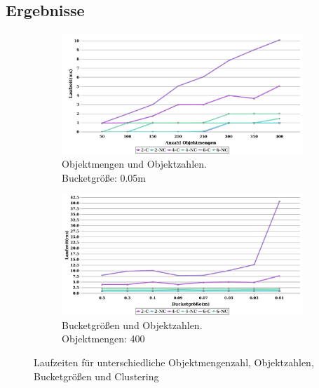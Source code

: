 \subsection{Ergebnisse}

\begin{figure}
  \centering
  \begin{subfigure}[b]{0.85\textwidth}
  \centering
  \includegraphics[width=1.0\textwidth]{bilder/eval1.pdf}
  \caption{Objektmengen und Objektzahlen.\\ Bucketgröße: 0.05m}
  \label{fig:eval-sc-oc}
  \end{subfigure}
  \begin{subfigure}[b]{0.85\textwidth}
  \centering
  \includegraphics[width=1.0\textwidth]{bilder/eval2.pdf}
  \caption{Bucketgrößen und Objektzahlen.\\ Objektmengen: 400}
  \label{fig:eval-bs-oc}
  \end{subfigure}
  \caption{Laufzeiten für unterschiedliche Objektmengenzahl, Objektzahlen, Bucketgrößen und Clustering}
\end{figure}

